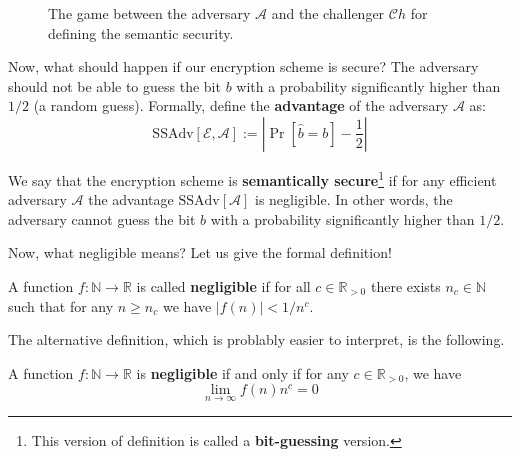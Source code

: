 \documentclass[../lecture-notes.tex]{subfiles}
\begin{document}
\begin{figure}[H]
{
    }
    \caption{The game between the adversary $\mathcal{A}$ and the challenger $\mathcal{C}h$ for defining the semantic security.}
\end{figure}

Now, what should happen if our encryption scheme is secure? The adversary should not be able to guess the bit $b$ with a probability significantly higher than $1/2$ (a random guess). Formally, define the 
\textbf{advantage} of the adversary $\mathcal{A}$ as:
\begin{equation*}
    \text{SSAdv}[\mathcal{E}, \mathcal{A}] := \left| \Pr[\hat{b} = b] - \frac{1}{2} \right|
\end{equation*}

We say that the encryption scheme is \textbf{semantically secure}\footnote{This version of definition is called a \textbf{bit-guessing} version.} if for any efficient adversary $\mathcal{A}$ the advantage $\text{SSAdv}[\mathcal{A}]$ is negligible. In other words, the adversary cannot guess the bit $b$ with a probability significantly higher than $1/2$.

Now, what negligible means? Let us give the formal definition!

\begin{definition}
    A function $f: \mathbb{N} \to \mathbb{R}$ is called \textbf{negligible} if for all $c \in \mathbb{R}_{>0}$ there exists $n_c \in \mathbb{N}$ such that for any $n \geq n_c$ we have $|f(n)| < 1/n^c$.
\end{definition}

The alternative definition, which is problably easier to interpret, is the following.

\begin{theorem}
    A function $f: \mathbb{N} \to \mathbb{R}$ is \textbf{negligible} if and only if for any $c \in \mathbb{R}_{>0}$, we have
    \begin{equation*}
        \lim_{n \to \infty} f(n)n^c = 0
    \end{equation*}
\end{theorem}
\end{document}
